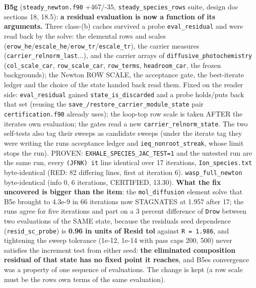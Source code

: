 \documentclass[english,a4paper]{my_memo}
\begin{document}
\begin{itemize}
  \textbf{B5g} (\texttt{steady\_newton.f90} +467/-35, \texttt{steady\_species\_rows} suite,
  design doc sections 18, 18.5): \textbf{a residual evaluation is now a function
  of its arguments.} Three class-(b) caches survived a probe
  \texttt{eval\_residual} and were read back by the solve: the elemental rows and
  scales (\texttt{erow\_he}/\texttt{escale\_he}/\texttt{erow\_tr}/\texttt{escale\_tr}), the carrier measures
  (\texttt{carrier\_relnorm\_last}...), and the carrier arrays of
  \texttt{diffusive\_photochemistry} (\texttt{col\_scale\_car}, \texttt{row\_scale\_car}, \texttt{row\_terms},
  \texttt{headroom\_car}, the frozen backgrounds); the Newton ROW SCALE, the
  acceptance gate, the best-iterate ledger and the choice of the state
  handed back read them. Fixed on the reader side: \texttt{eval\_residual} gained
  \texttt{state\_is\_discarded} and a probe holds/puts back that set (reusing the
  \texttt{save\_/restore\_carrier\_module\_state} pair \texttt{certification.f90} already
  uses); the loop-top row scale is taken AFTER the iterate\textquotesingle s own evaluation;
  the gates read a new \texttt{carrier\_relnorm\_state}. The two self-tests also tag
  their sweeps as candidate sweeps (under the iterate tag they were writing
  the run\textquotesingle s acceptance ledger and \texttt{ieq\_nonroot\_streak}, whose limit stops
  the run). PROVEN: \texttt{EXHALE\_SPECIES\_JAC\_TEST=1} and the untested run are the
  same run, every \texttt{(JFNK)\ it} line identical over 17 iterations,
  \texttt{Ion\_species.txt} byte-identical (RED: 82 differing lines, first at
  iteration 6). \texttt{wasp\_full\_newton} byte-identical (info 0, 6 iterations,
  CERTIFIED, 13.30). \textbf{What the fix uncovered is bigger than the item}: the
  \texttt{mol\_diffusion} element solve that B5e brought to 4.3e-9 in 66 iterations
  now STAGNATES at 1.957 after 17; the runs agree for five iterations and
  part on a 3 percent difference of \texttt{Drow} between two evaluations of the
  SAME state, because the residual\textquotesingle s seed dependence (\texttt{resid\_sc\_probe}) is
  \textbf{0.96 in units of Resid tol} against \texttt{\textbar{}\textbar{}R\textbar{}\textbar{}\ =\ 1.986}, and tightening the
  sweep tolerance (1e-12, 1e-14 with pass caps 200, 500) never satisfies
  the increment test from either seed: \textbf{the eliminated composition
  residual of that state has no fixed point it reaches}, and B5e\textquotesingle s
  convergence was a property of one sequence of evaluations. The change is
  kept (a row scale must be the row\textquotesingle s own terms of the same evaluation).

\end{itemize}
\end{document}
